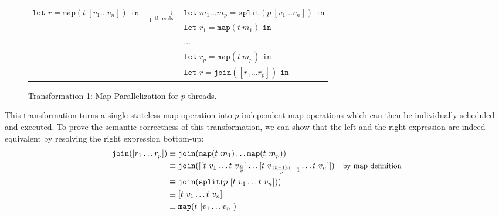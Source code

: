 \begin{figure}[h]
    \begin{tabular}{l c l}
        \multirow{5}{*}{$\texttt{let } r = \texttt{map} (t\ [v_1 \dots v_n]) \texttt{ in}$} & \multirow{5}{*}{$\underset{\text{p threads}}{\longrightarrow}$} & $\texttt{let } m_1 \dots m_p = \texttt{split} (p\ [v_1 \dots v_n]) \texttt{ in}$\\
                                                                                            &&\hspace*{.3cm} $\texttt{let } r_1 = \texttt{map} (t\ m_1) \texttt{ in}$\\
                                                                                            &&\hspace*{.6cm} $\dots$\\
                                                                                            &&\hspace*{.9cm} $\texttt{let } r_p = \texttt{map} (t\ m_p) \texttt{ in}$\\
                                                                                            &&\hspace*{1.2cm} $\texttt{let } r = \texttt{join} ([r_1 \dots r_p]) \texttt{ in}$\\
    \end{tabular}
    \caption{Transformation 1: Map Parallelization for $p$ threads.}%
    \label{fig:transformations:tf1}
\end{figure}

This transformation turns a single stateless map operation into $p$ independent map operations which can then be individually scheduled and executed.
To prove the semantic correctness of this transformation, we can show that the left and the right expression are indeed equivalent by resolving the right expression bottom-up:
\begin{align*}
    \texttt{join} ([r_1 \dots r_p]) &\equiv \texttt{join} (\texttt{map} (t\ m_1) \dots \texttt{map} (t\ m_p))\\
                                    &\equiv \texttt{join} ([[t\ v_1 \dots t\ v_{\frac{n}{p}}] \dots [t\ v_{\frac{(p-1) n}{p} + 1} \dots t\ v_n]])& \text{\small by map definition}\\
                                    &\equiv \texttt{join} (\texttt{split} (p\ [t\ v_1 \dots t\ v_n]))\\
                                    &\equiv [t\ v_1 \dots t\ v_n]\\
                                    &\equiv \texttt{map} (t\ [v_1 \dots v_n])
\end{align*}

